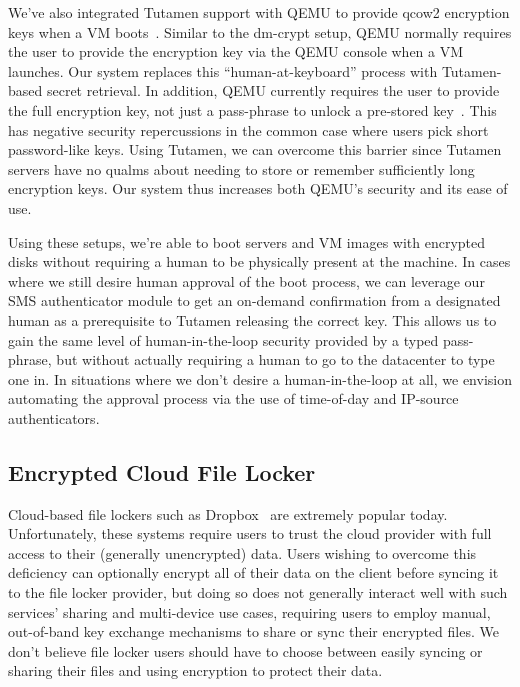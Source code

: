 We've also integrated Tutamen support with QEMU to provide qcow2
encryption keys when a VM boots~\cite{src-qemu-tutamen}. Similar to
the dm-crypt setup, QEMU normally requires the user to provide the
encryption key via the QEMU console when a VM launches. Our system
replaces this ``human-at-keyboard'' process with Tutamen-based secret
retrieval. In addition, QEMU currently requires the user to provide
the full encryption key, not just a pass-phrase to unlock a pre-stored
key~\cite{berrange-qemucrypto}. This has negative security
repercussions in the common case where users pick short password-like
keys. Using Tutamen, we can overcome this barrier since Tutamen
servers have no qualms about needing to store or remember sufficiently
long encryption keys. Our system thus increases both QEMU's security
and its ease of use.

Using these setups, we're able to boot servers and VM images with
encrypted disks without requiring a human to be physically present at
the machine. In cases where we still desire human approval of the boot
process, we can leverage our SMS authenticator module to get an
on-demand confirmation from a designated human as a prerequisite to
Tutamen releasing the correct key. This allows us to gain the same
level of human-in-the-loop security provided by a typed pass-phrase,
but without actually requiring a human to go to the datacenter to type
one in. In situations where we don't desire a human-in-the-loop at
all, we envision automating the approval process via the use of
time-of-day and IP-source authenticators.

\subsection{Encrypted Cloud File Locker}

Cloud-based file lockers such as Dropbox~\cite{dropbox} are extremely
popular today. Unfortunately, these systems require users to trust the
cloud provider with full access to their (generally unencrypted)
data. Users wishing to overcome this deficiency can optionally encrypt
all of their data on the client before syncing it to the file locker
provider, but doing so does not generally interact well with such
services' sharing and multi-device use cases, requiring users to
employ manual, out-of-band key exchange mechanisms to share or sync
their encrypted files. We don't believe file locker users should have
to choose between easily syncing or sharing their files and using
encryption to protect their data.

